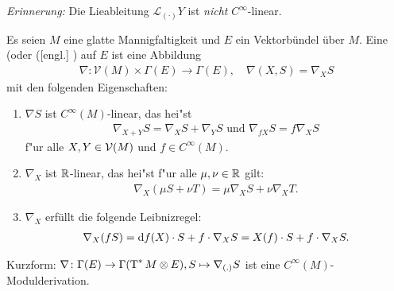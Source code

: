 \emph{Erinnerung:} Die Lieableitung $\mathcal L_{(\cdot)}Y$ ist \emph{nicht} $C^{\infty}$-linear.

\begin{Dfn}
  Es seien $M$ eine glatte Mannigfaltigkeit und $E$ ein Vektorbündel über $M$.
  Eine  (oder  ([engl.] ) auf $E$ ist eine Abbildung
  \begin{align*}
    \nabla \colon \mathcal V(M) \times \Gamma(E) \to \Gamma(E), \quad \nabla(X,S) = \nabla_XS
  \end{align*}
  mit den folgenden Eigenschaften:
  \begin{enumerate}[label=(\roman*),widest=iii]
  \item $\nabla S$ ist $C^{\infty}(M)$-linear, das hei"st
    \begin{align*}
      \nabla_{X+Y}S = \nabla_XS+\nabla_YS \text{ und } \nabla_{fX}S = f\nabla_XS
    \end{align*}
    f"ur alle $X, Y \in \operatorname{\mathcal{V}}(M)$ und $f \in C^{\infty}(M)$.
  \item $\nabla_X$ ist $\operatorname{\mathbb{R}}$-linear, das hei"st f"ur alle $\mu, \nu \in \operatorname{\mathbb{R}}$ gilt:
    \begin{align*}
      \nabla_X(\mu S + \nu T) = \mu\nabla_XS + \nu\nabla_XT.
    \end{align*}
  \item $\nabla_X$ erfüllt die folgende Leibnizregel:
    \begin{align*}
      \nabla_X(fS) = \mathrm{d} f(X) \cdot S + f\cdot \nabla_XS = X(f)\cdot S + f \cdot \nabla_XS.
    \end{align*}
  \end{enumerate}
  Kurzform: $\nabla \colon \Gamma(E) \to \Gamma(\operatorname{T}^{*}M \otimes E), S \mapsto \nabla_{(.)}S$ ist eine $C^{\infty}(M)$-Modulderivation.
\end{Dfn}

